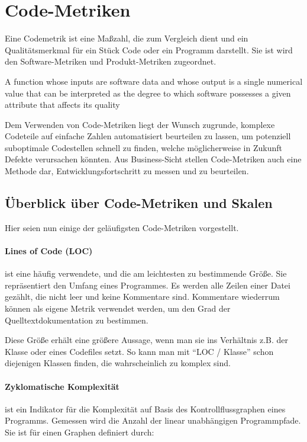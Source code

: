 \section{Code-Metriken}
Eine Codemetrik ist eine Maßzahl, die zum Vergleich dient und ein Qualitätsmerkmal für ein Stück Code oder ein Programm darstellt. Sie ist wird den Software-Metriken und Produkt-Metriken zugeordnet.

\epigraph{A function whose inputs are software data and whose output is a single
numerical value that can be interpreted as the degree to which software possesses a given attribute that affects its quality}{\citep{ieee_1998}}

Dem Verwenden von Code-Metriken liegt der Wunsch zugrunde, komplexe Codeteile auf einfache Zahlen automatisiert beurteilen zu lassen, um potenziell suboptimale Codestellen schnell zu finden, welche möglicherweise in Zukunft Defekte verursachen könnten. Aus Business-Sicht stellen Code-Metriken auch eine Methode dar, Entwicklungsfortschritt zu messen und zu beurteilen.
\subsection{Überblick über Code-Metriken und Skalen}
Hier seien nun einige der geläufigsten Code-Metriken vorgestellt.
\paragraph{Lines of Code (LOC)} ist eine häufig verwendete, und die am leichtesten zu bestimmende Größe. Sie repräsentiert den Umfang eines Programmes. Es werden alle Zeilen einer Datei gezählt, die nicht leer und keine Kommentare sind. Kommentare wiederrum können als eigene Metrik verwendet werden, um den Grad der Quelltextdokumentation zu bestimmen.

Diese Größe erhält eine größere Aussage, wenn man sie ins Verhältnis z.B. der Klasse oder eines Codefiles setzt. So kann man mit "`LOC / Klasse"' schon diejenigen Klassen finden, die wahrscheinlich zu komplex sind. \\

\paragraph{Zyklomatische Komplexität} ist ein Indikator für die Komplexität auf Basis des Kontrollflussgraphen eines Programms. Gemessen wird die Anzahl der linear unabhängigen Programmpfade. Sie ist für einen Graphen definiert durch:

